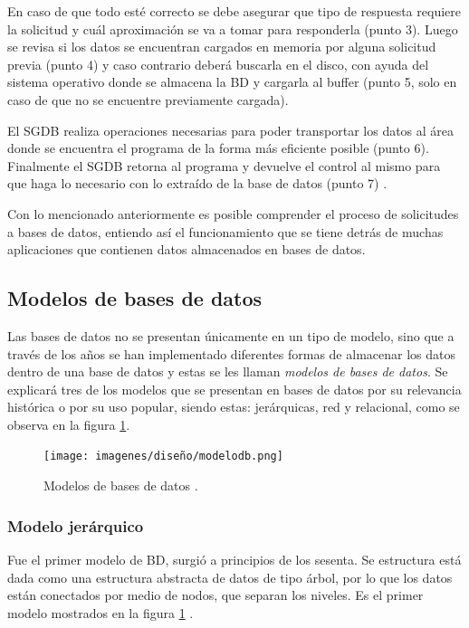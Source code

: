 \par
En caso de que todo esté correcto se debe asegurar que tipo de respuesta requiere la solicitud y cuál aproximación se va a tomar para responderla (punto 3). Luego se revisa si los datos se encuentran cargados en memoria por alguna solicitud previa (punto 4) y caso contrario deberá buscarla en el disco, con ayuda del sistema operativo donde se almacena la BD y cargarla al buffer (punto 5, solo en caso de que no se encuentre previamente cargada)\cite{camps_paré_2005}.
\par
El SGDB realiza operaciones necesarias para poder transportar los datos al área donde se encuentra el programa de la forma más eficiente posible (punto 6). Finalmente el SGDB retorna al programa y devuelve el control al mismo para que haga lo necesario con lo extraído de la base de datos (punto 7) \cite{camps_paré_2005}. 
\par
Con lo mencionado anteriormente es posible comprender el proceso de solicitudes a bases de datos, entiendo así el funcionamiento que se tiene detrás de muchas aplicaciones que contienen datos almacenados en bases de datos.


\subsection{Modelos de bases de datos}
\par
Las bases de datos no se presentan únicamente en un tipo de modelo, sino que a través de los años se han implementado diferentes formas de almacenar los datos dentro de una base de datos y estas se les llaman \textit{modelos de bases de datos}. Se explicará tres de los modelos que se presentan en bases de datos por su relevancia histórica o por su uso popular, siendo estas: jerárquicas, red y relacional, como se observa en la figura \ref{BDmodels}.
\begin{figure}[h!]
    \centering
    \texttt{[image: imagenes/diseño/modelodb.png]}
    \caption{Modelos de bases de datos \cite{camps_paré_2005}.}
    \label{BDmodels}
\end{figure}

\subsubsection{Modelo jerárquico}
\par
Fue el primer modelo de BD, surgió a principios de los sesenta. Se estructura está dada como una estructura abstracta de datos de tipo árbol, por lo que los datos están conectados por medio de nodos, que separan los niveles. Es el primer modelo mostrados en la figura \ref{BDmodels} \cite{camps_paré_2005}.

